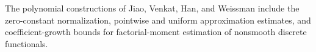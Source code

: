 The polynomial constructions of Jiao, Venkat, Han, and Weissman include the zero-constant normalization, pointwise and uniform approximation estimates, and coefficient-growth bounds for factorial-moment estimation of nonsmooth discrete functionals.